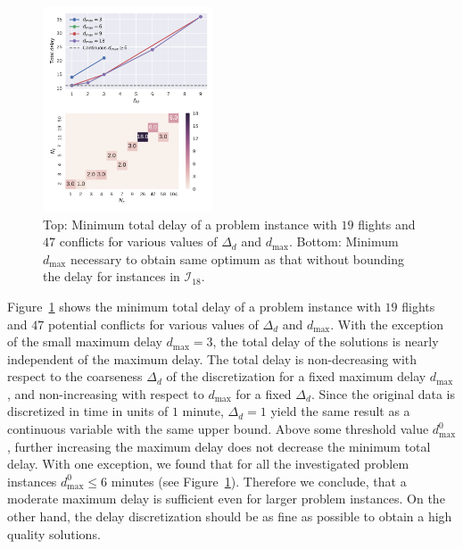 \begin{figure}[h]
\centering
\includegraphics[width=0.45\textwidth]{./pics/delay_only_cp_results.pdf}
\caption[Effect of discretization on solution quality]{Top: Minimum total delay of a problem instance with $19$ flights and $47$ conflicts for various values of $\Delta_d$ and $d_{\max}$.
Bottom: Minimum $d_\text{max}$ necessary to obtain same optimum as that without bounding the delay for instances in $\mathcal I_{18}$.}
\label{fig:delay_only_cp_results}
\end{figure}

Figure~\ref{fig:delay_only_cp_results} shows the minimum total delay of a problem instance with $19$ flights and $47$ potential conflicts for various values of $\Delta_d$ and $d_{\max}$.
With the exception of the small maximum delay $d_\text{max} = 3$, the total delay of the solutions is nearly independent of the maximum delay.
The total delay is non-decreasing with respect to the coarseness $\Delta_d$ of the discretization for a fixed maximum delay $d_{\max}$, and non-increasing with respect to $d_{\max}$ for a fixed $\Delta_d$.
Since the original data is discretized in time in units of $1$ minute, $\Delta_d=1$ yield the same result as a continuous variable with the same upper bound.
Above some threshold value $d^0_\text{max}$, further increasing the maximum delay does not decrease the minimum total delay.
With one exception, we found that for all the investigated problem instances $d^0_\text{max}\leq6$ minutes (see Figure~\ref{fig:delay_only_cp_results}).
Therefore we conclude, that a moderate maximum delay is sufficient even for larger problem instances.
On the other hand, the delay discretization should be as fine as possible to obtain a high quality solutions.




